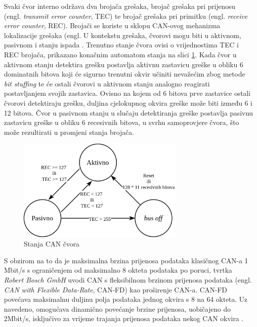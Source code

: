 \documentclass[times, utf8, diplomski, numeric]{fer}
\begin{document}
Svaki čvor interno održava dva brojača grešaka, brojač grešaka pri prijenosu (engl. \textit{transmit error counter}, TEC) te brojač grešaka pri primitku (engl. \textit{receive error counter}, REC). Brojači se koriste u sklopu CAN-ovog mehanizma lokalizacije grešaka (engl.  U kontekstu grešaka, čvorovi mogu biti u aktivnom, pasivnom i stanju ispada . Trenutno stanje čvora ovisi o vrijednostima TEC i REC brojača, prikazano konačnim automatom stanja na slici \ref{fig:error_stanja}. Kada čvor u aktivnom stanju detektira grešku postavlja aktivnu zastavicu greške u obliku 6 dominatnih bitova koji će sigurno trenutni okvir učiniti nevažećim zbog metode \textit{bit stuffing} te će ostali čvorovi u aktivnom stanju analogno reagirati postavljanjem svojih zastavica. Ovisno na kojem od 6 bitova prve zastavice ostali čvorovi detektiraju grešku, duljina cjelokupnog okvira greške može biti između 6 i 12 bitova. Čvor u pasivnom stanju u slučaju detektiranja greške postavlja pasivnu zastavicu greške u obliku 6 recesivnih bitova, u svrhu samoprovjere čvora, što može rezultirati u promjeni stanja brojača. 
\newpage
\begin{figure}[htb]
\centering
\includegraphics[width=230pt]{slike/stanja.png}
\caption{Stanja CAN čvora}
\label{fig:error_stanja}
\end{figure}

S obzirom na to da je maksimalna brzina prijenosa podataka klasičnog CAN-a 1 Mbit/s s ograničenjem od maksimalno 8 okteta podataka po poruci, tvrtka \textit{Robert Bosch GmbH} uvodi CAN s fleksibilnom brzinom prijenosa podataka (engl. \textit{CAN with Flexible Data-Rate}, CAN-FD) kao proširenje CAN-a. CAN-FD povećava maksimalnu duljinu polja podataka jednog okvira s 8 na 64 okteta. Uz navedeno, omogućava dinamično povećanje brzine prijenosa, uobičajeno do 2Mbit/s, isključivo za vrijeme trajanja prijenosa podataka nekog CAN okvira \cite{bosch2022handbook,nasser2023automotive}.
\end{document}
